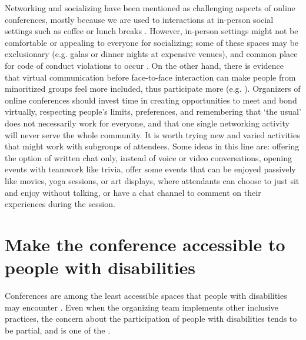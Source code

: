 \documentclass[10pt,letterpaper]{article}
\begin{document}
Networking and socializing have been mentioned as challenging aspects of online conferences, mostly because we are used to interactions at in-person social settings such as coffee or lunch breaks \cite{salibaGettingGripsOnline2020, roosOnlineConferencesNew2020}. 
However, in-person settings might not be comfortable or appealing to everyone for socializing; 
some of these spaces may be exclusionary (e.g. galas or dinner nights at expensive venues), and common place for code of conduct violations to occur \cite{auroraHowRespondCode2019}. 
On the other hand, there is evidence that virtual communication before face-to-face interaction can make people from minoritized groups feel more included, thus participate more (e.g. \cite{trianaDoesOrderFacetoFace2012}).
Organizers of online conferences should invest time in creating opportunities to meet and bond virtually, respecting people's limits, preferences, and remembering that `the usual' does not necessarily work for everyone, and that one single networking activity will never serve the whole community. 
It is worth trying new and varied activities that might work with subgroups of attendees.
Some ideas in this line are: offering the option of written chat only, instead of voice or video conversations, opening events with teamwork like trivia, offer some events that can be enjoyed passively like movies, yoga sessions, or art displays, where attendants can choose to just sit and enjoy without talking, or have a chat channel to comment on their experiences during the session.


\section{Make the conference accessible to people with disabilities}
\label{rule_accessibility}


Conferences are among the least accessible spaces that people with disabilities may encounter \cite{priceAccessImaginedConstruction2009}. Even when the organizing team implements other inclusive practices, the concern about the participation of people with disabilities tends to be partial, and is one of the . 
\end{document}
